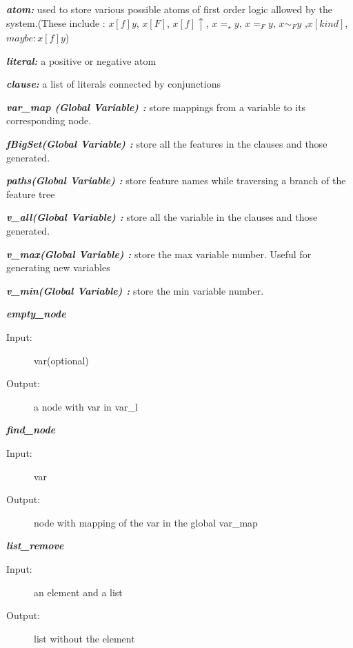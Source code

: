 \documentclass[12pt]{article}
\begin{document}
\begin{description}
\item \textbf{\textit{atom:}} used to store various possible atoms of first order logic allowed by the system.(These include : $x[f]y$, $x[F]$, $x[f]\uparrow$, $x=_\star y$, $x=_F y$, $x\sim_F y$ ,$x[kind]$, $maybe:x[f]y$)
\item \textbf{\textit{literal:}} a positive or negative atom
\item \textbf{\textit{clause:}} a list of literals connected by conjunctions
\item \textbf{\textit{var\_map (Global Variable) :}} store mappings from a variable to its corresponding node.
\item \textbf{\textit{fBigSet(Global Variable) :}} store all the features in the clauses and those generated.
\item \textbf{\textit{paths(Global Variable) :}} store feature names while traversing a branch of the feature tree
\item \textbf{\textit{v\_all(Global Variable) :}} store all the variable in the clauses and those generated.
\item \textbf{\textit{v\_max(Global Variable) :}} store the max variable number. Useful for generating new variables
\item \textbf{\textit{v\_min(Global Variable) :}} store the min variable number.

\item \textbf{\textit{empty\_node}}
\begin{description}
    \item[Input:] var(optional)
    \item[Output:] a node with var in var\_l
\end{description}

\item \textbf{\textit{find\_node}} 
\begin{description}
    \item[Input:] var
    \item[Output:] node with mapping of the var in the global var\_map
\end{description}

\item \textbf{\textit{list\_remove}}
\begin{description}
    \item[Input:] an element and a list
    \item[Output:] list without the element
\end{description}

\end{description}
\end{document}
